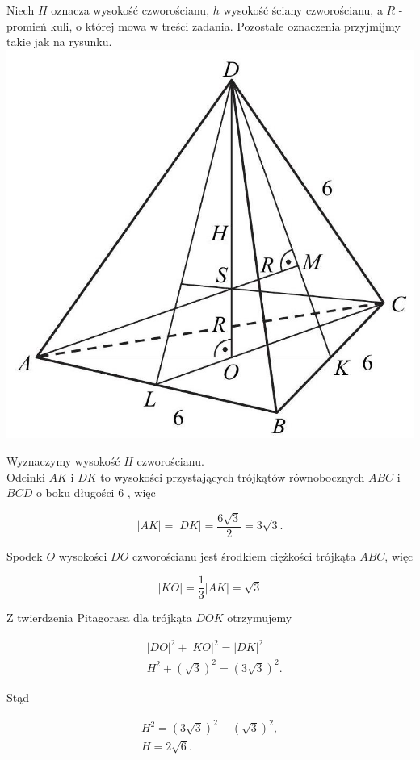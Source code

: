 \documentclass[10pt]{article}
\begin{document}
Niech $H$ oznacza wysokość czworościanu, $h$ wysokość ściany czworościanu, a $R$ - promień kuli, o której mowa w treści zadania. Pozostałe oznaczenia przyjmijmy takie jak na rysunku.\\
\includegraphics[max width=\textwidth, center]{2025_02_07_cd06b1485e4d114dda29g-12}

Wyznaczymy wysokość $H$ czworościanu.\\
Odcinki $A K$ i $D K$ to wysokości przystających trójkątów równobocznych $A B C$ i $B C D$ o boku długości 6 , więc

$$
|A K|=|D K|=\frac{6 \sqrt{3}}{2}=3 \sqrt{3} .
$$

Spodek $O$ wysokości $D O$ czworościanu jest środkiem ciężkości trójkąta $A B C$, więc

$$
|K O|=\frac{1}{3}|A K|=\sqrt{3}
$$

Z twierdzenia Pitagorasa dla trójkąta $D O K$ otrzymujemy

$$
\begin{aligned}
& |D O|^{2}+|K O|^{2}=|D K|^{2} \\
& H^{2}+(\sqrt{3})^{2}=(3 \sqrt{3})^{2} .
\end{aligned}
$$

Stąd

$$
\begin{gathered}
H^{2}=(3 \sqrt{3})^{2}-(\sqrt{3})^{2}, \\
H=2 \sqrt{6} .
\end{gathered}
$$
\end{document}
